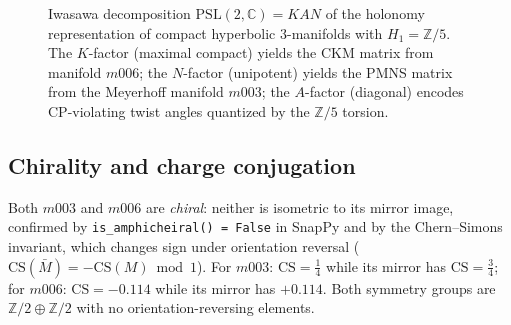 \documentclass[12pt]{article}
\theoremstyle{definition}
\begin{document}
\begin{figure}[htbp]
\centering
{}
\caption{Iwasawa decomposition $\mathrm{PSL}(2,\mathbb{C})=KAN$ of the
holonomy representation of compact hyperbolic 3-manifolds with
$H_1=\mathbb{Z}/5$. The $K$-factor (maximal compact) yields the CKM
matrix from manifold $m006$; the $N$-factor (unipotent) yields the
PMNS matrix from the Meyerhoff manifold $m003$; the $A$-factor
(diagonal) encodes CP-violating twist angles quantized by the
$\mathbb{Z}/5$ torsion.}
\label{fig:kan}
\end{figure}


\subsection{Chirality and charge conjugation}
\label{subsec:chirality}

Both $m003$ and $m006$ are \emph{chiral}: neither is isometric to
its mirror image, confirmed by \texttt{is\_amphicheiral() = False} in
SnapPy and by the Chern--Simons invariant, which changes sign under
orientation reversal ($\mathrm{CS}(\bar{M}) = -\mathrm{CS}(M)
\bmod 1$). For $m003$: $\mathrm{CS} = \tfrac{1}{4}$ while its mirror
has $\mathrm{CS} = \tfrac{3}{4}$; for $m006$: $\mathrm{CS} = -0.114$
while its mirror has $+0.114$. Both symmetry groups are
$\mathbb{Z}/2\oplus\mathbb{Z}/2$ with no orientation-reversing
elements.
\end{document}
